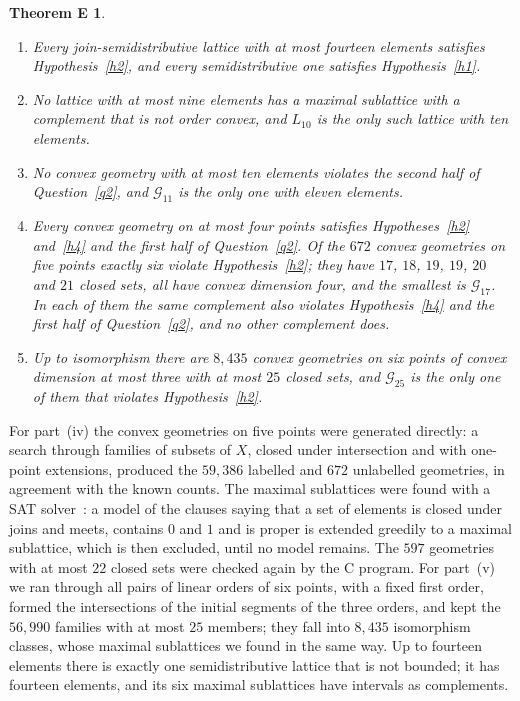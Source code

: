 \documentclass[11pt]{amsart}
\newtheorem*{theoremE}{Theorem E}
\theoremstyle{definition}
\theoremstyle{remark}
\numberwithin{equation}{section}
\begin{document}
\begin{theoremE}
\begin{enumerate}[label=\textup{(\roman*)},leftmargin=*]
\item Every join-semidistributive lattice with at most fourteen elements satisfies Hypothesis~\ref{h2}, and every semidistributive one satisfies Hypothesis~\ref{h1}.
\item No lattice with at most nine elements has a maximal sublattice with a complement that is not order convex, and $L_{10}$ is the only such lattice with ten elements.
\item No convex geometry with at most ten elements violates the second half of Question~\ref{q2}, and $\mathcal G_{11}$ is the only one with eleven elements.
\item Every convex geometry on at most four points satisfies Hypotheses~\ref{h2} and~\ref{h4} and the first half of Question~\ref{q2}. Of the $672$ convex geometries on five points exactly six violate Hypothesis~\ref{h2}; they have $17$, $18$, $19$, $19$, $20$ and $21$ closed sets, all have convex dimension four, and the smallest is $\mathcal G_{17}$. In each of them the same complement also violates Hypothesis~\ref{h4} and the first half of Question~\ref{q2}, and no other complement does.
\item Up to isomorphism there are $8{,}435$ convex geometries on six points of convex dimension at most three with at most $25$ closed sets, and $\mathcal G_{25}$ is the only one of them that violates Hypothesis~\ref{h2}.
\end{enumerate}
\end{theoremE}

For part~(iv) the convex geometries on five points were generated directly: a search through families of subsets of $X$, closed under intersection and with one-point extensions, produced the $59{,}386$ labelled and $672$ unlabelled geometries, in agreement with the known counts. The maximal sublattices were found with a SAT solver~\cite{IMM}: a model of the clauses saying that a set of elements is closed under joins and meets, contains $0$ and $1$ and is proper is extended greedily to a maximal sublattice, which is then excluded, until no model remains. The $597$ geometries with at most $22$ closed sets were checked again by the C program. For part~(v) we ran through all pairs of linear orders of six points, with a fixed first order, formed the intersections of the initial segments of the three orders, and kept the $56{,}990$ families with at most $25$ members; they fall into $8{,}435$ isomorphism classes, whose maximal sublattices we found in the same way. Up to fourteen elements there is exactly one semidistributive lattice that is not bounded; it has fourteen elements, and its six maximal sublattices have intervals as complements.
\end{document}
